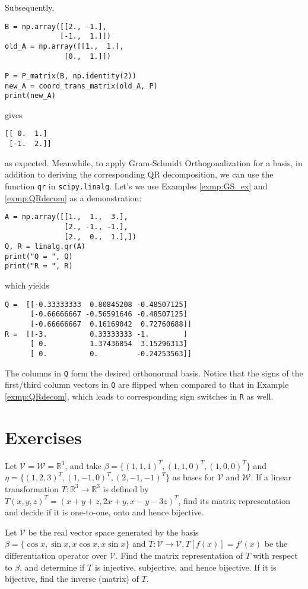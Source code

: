 Subsequently,
\begin{lstlisting}
B = np.array([[2., -1.], 
             [-1.,  1.]])
old_A = np.array([[1.,  1.], 
              [0.,  1.]])

P = P_matrix(B, np.identity(2))
new_A = coord_trans_matrix(old_A, P)
print(new_A)    
\end{lstlisting}
gives
\begin{lstlisting}
[[ 0.  1.]
 [-1.  2.]]    
\end{lstlisting}
as expected. Meanwhile, to apply Gram-Schmidt Orthogonalization for a basis, in addition to deriving the corresponding QR decomposition, we can use the function \verb|qr| in \verb|scipy.linalg|. Let's we use Examples \ref{exmp:GS_ex} and \ref{exmp:QRdecom} as a demonstration:
\begin{lstlisting}
A = np.array([[1.,  1.,  3.],
              [2., -1., -1.],
              [2.,  0.,  1.],])
Q, R = linalg.qr(A)
print("Q = ", Q)
print("R = ", R)
\end{lstlisting}
which yields
\begin{lstlisting}
Q =  [[-0.33333333  0.80845208 -0.48507125]
      [-0.66666667 -0.56591646 -0.48507125]
      [-0.66666667  0.16169042  0.72760688]]
R =  [[-3.          0.33333333 -1.        ]
      [ 0.          1.37436854  3.15296313]
      [ 0.          0.         -0.24253563]]
\end{lstlisting}
The columns in \verb|Q| form the desired orthonormal basis. Notice that the signs of the first/third column vectors in \verb|Q| are flipped when compared to that in Example \ref{exmp:QRdecom}, which leads to corresponding sign switches in \verb|R| as well.

\section{Exercises}

\begin{Exercise}
Let $\mathcal{V} = \mathcal{W} = \mathbb{R}^3$, and take $\mathcal{\beta} = \{(1,1,1)^T, (1,1,0)^T, (1,0,0)^T\}$ and $\mathcal{\eta} = \{(1,2,3)^T, (1,-1,0)^T, (2,-1,-1)^T\}$ as bases for $\mathcal{V}$ and $\mathcal{W}$. If a linear transformation $T: \mathbb{R}^3 \to \mathbb{R}^3$ is defined by $T(x,y,z)^T = (x+y+z,2x+y,x-y-3z)^T$, find its matrix representation and decide if it is one-to-one, onto and hence bijective.
\end{Exercise}

\begin{Exercise}
Let $\mathcal{V}$ be the real vector space generated by the basis $\mathcal{\beta} = \{\cos x, \sin x, x\cos x, x\sin x\}$ and $T: \mathcal{V} \to \mathcal{V}, T[f(x)] = f'(x)$ be the differentiation operator over $\mathcal{V}$. Find the matrix representation of $T$ with respect to $\mathcal{\beta}$, and determine if $T$ is injective, subjective, and hence bijective. If it is bijective, find the inverse (matrix) of $T$.
\end{Exercise}

